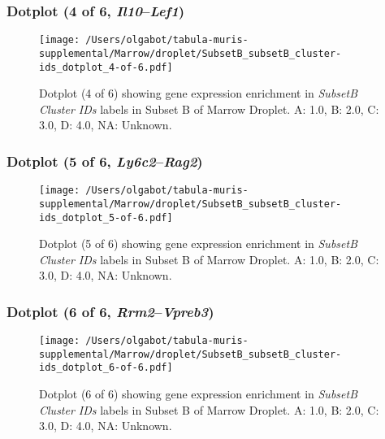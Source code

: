 \clearpage

\subsubsection{Dotplot (4 of 6, \emph{Il10}--\emph{Lef1})}
\begin{figure}[h]
\centering
\texttt{[image: /Users/olgabot/tabula-muris-supplemental/Marrow/droplet/SubsetB\_subsetB\_cluster-ids\_dotplot\_4-of-6.pdf]}

\caption{ Dotplot (4 of 6)  showing gene expression enrichment in \emph{SubsetB Cluster IDs} labels in Subset B of Marrow Droplet. A: 1.0, B: 2.0, C: 3.0, D: 4.0, NA: Unknown.}
\end{figure}


\clearpage

\subsubsection{Dotplot (5 of 6, \emph{Ly6c2}--\emph{Rag2})}
\begin{figure}[h]
\centering
\texttt{[image: /Users/olgabot/tabula-muris-supplemental/Marrow/droplet/SubsetB\_subsetB\_cluster-ids\_dotplot\_5-of-6.pdf]}

\caption{ Dotplot (5 of 6)  showing gene expression enrichment in \emph{SubsetB Cluster IDs} labels in Subset B of Marrow Droplet. A: 1.0, B: 2.0, C: 3.0, D: 4.0, NA: Unknown.}
\end{figure}


\clearpage

\subsubsection{Dotplot (6 of 6, \emph{Rrm2}--\emph{Vpreb3})}
\begin{figure}[h]
\centering
\texttt{[image: /Users/olgabot/tabula-muris-supplemental/Marrow/droplet/SubsetB\_subsetB\_cluster-ids\_dotplot\_6-of-6.pdf]}

\caption{ Dotplot (6 of 6)  showing gene expression enrichment in \emph{SubsetB Cluster IDs} labels in Subset B of Marrow Droplet. A: 1.0, B: 2.0, C: 3.0, D: 4.0, NA: Unknown.}
\end{figure}

